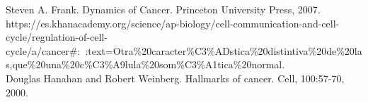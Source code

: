 \begin{thebibliography}{99}
\vskip 0.2cm
 Steven A. Frank. Dynamics of Cancer. Princeton University Press, 2007.\\ 

\vskip 0.2cm
 https://es.khanacademy.org/science/ap-biology/cell-communication-and-cell-cycle/regulation-of-cell-cycle/a/cancer\#:~:text=Otra\%20caracter\%C3\%ADstica\%20distintiva\%20de\%20las,que\%20una\%20c\%C3\%A9lula\%20som\%C3\%A1tica\%20normal.\\ 

\vskip 0.2cm
 Douglas Hanahan and Robert Weinberg. Hallmarks of cancer. Cell, 100:57-70, 2000. \\ 









\end{thebibliography}

